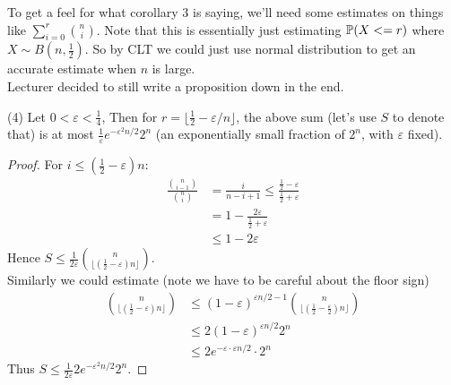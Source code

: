 \documentclass[a4paper]{article}
\begin{document}
To get a feel for what corollary 3 is saying, we'll need some estimates on things like $\sum_{i=0}^r {n\choose i}$. Note that this is essentially just estimating $\P(X<=r)$ where $X \sim B(n,\frac{1}{2})$. So by CLT we could just use normal distribution to get an accurate estimate when $n$ is large.\\
Lecturer decided to still write a proposition down in the end.

\begin{prop} (4)
    Let $0 < \varepsilon < \frac{1}{4}$, Then for $r=\lfloor \frac{1}{2} -\varepsilon/n\rfloor$, the above sum (let's use $S$ to denote that) is at most $\frac{1}{\varepsilon} e^{-\varepsilon^2 n/2} 2^n$ (an exponentially small fraction of $2^n$, with $\varepsilon$ fixed).\\
    \begin{proof}
        For $i \leq (\frac{1}{2} - \varepsilon) n$:
        \begin{equation*}
            \begin{aligned}
                \frac{{n \choose {i-1}}}{{n \choose i}} &= \frac{i}{n-i+1} \leq \frac{\frac{1}{2}-\varepsilon}{\frac{1}{2}+\varepsilon}\\
                &= 1-\frac{2\varepsilon}{\frac{1}{2}+\varepsilon}\\
                &\leq 1-2\varepsilon
            \end{aligned}
        \end{equation*}
        Hence $S \leq \frac{1}{2\varepsilon}{n \choose {\lfloor (\frac{1}{2}-\varepsilon) n \rfloor}}$.\\
        Similarly we could estimate (note we have to be careful about the floor sign)
        \begin{equation*}
            \begin{aligned}
                {n \choose {\lfloor (\frac{1}{2}-\varepsilon) n \rfloor}} &\leq (1-\varepsilon)^{\varepsilon n/2-1} {n \choose {\lfloor (\frac{1}{2}-\frac{\varepsilon}{2}) n \rfloor}}\\
                &\leq 2(1-\varepsilon)^{\varepsilon n/2} 2^n\\
                &\leq 2 e^{-\varepsilon \cdot \varepsilon n/2} \cdot 2^n
            \end{aligned}
        \end{equation*}
        Thus $S \leq \frac{1}{2\varepsilon} 2e^{-\varepsilon^2 n/2} 2^n$.
    \end{proof}
\end{prop}
\end{document}
